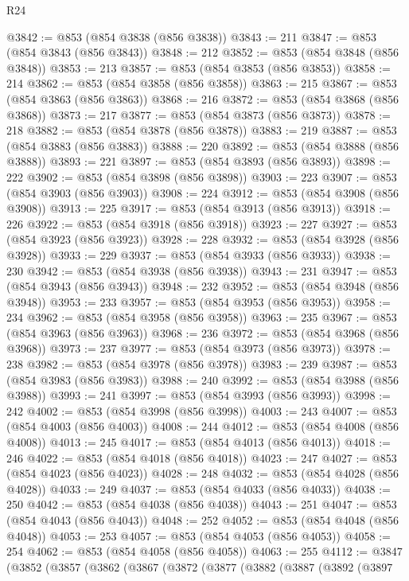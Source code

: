 \begin{lexlean}{R24}
\begin{coremodule}
@3842 := @853 (@854 @3838 (@856 @3838))
@3843 := 211
@3847 := @853 (@854 @3843 (@856 @3843))
@3848 := 212
@3852 := @853 (@854 @3848 (@856 @3848))
@3853 := 213
@3857 := @853 (@854 @3853 (@856 @3853))
@3858 := 214
@3862 := @853 (@854 @3858 (@856 @3858))
@3863 := 215
@3867 := @853 (@854 @3863 (@856 @3863))
@3868 := 216
@3872 := @853 (@854 @3868 (@856 @3868))
@3873 := 217
@3877 := @853 (@854 @3873 (@856 @3873))
@3878 := 218
@3882 := @853 (@854 @3878 (@856 @3878))
@3883 := 219
@3887 := @853 (@854 @3883 (@856 @3883))
@3888 := 220
@3892 := @853 (@854 @3888 (@856 @3888))
@3893 := 221
@3897 := @853 (@854 @3893 (@856 @3893))
@3898 := 222
@3902 := @853 (@854 @3898 (@856 @3898))
@3903 := 223
@3907 := @853 (@854 @3903 (@856 @3903))
@3908 := 224
@3912 := @853 (@854 @3908 (@856 @3908))
@3913 := 225
@3917 := @853 (@854 @3913 (@856 @3913))
@3918 := 226
@3922 := @853 (@854 @3918 (@856 @3918))
@3923 := 227
@3927 := @853 (@854 @3923 (@856 @3923))
@3928 := 228
@3932 := @853 (@854 @3928 (@856 @3928))
@3933 := 229
@3937 := @853 (@854 @3933 (@856 @3933))
@3938 := 230
@3942 := @853 (@854 @3938 (@856 @3938))
@3943 := 231
@3947 := @853 (@854 @3943 (@856 @3943))
@3948 := 232
@3952 := @853 (@854 @3948 (@856 @3948))
@3953 := 233
@3957 := @853 (@854 @3953 (@856 @3953))
@3958 := 234
@3962 := @853 (@854 @3958 (@856 @3958))
@3963 := 235
@3967 := @853 (@854 @3963 (@856 @3963))
@3968 := 236
@3972 := @853 (@854 @3968 (@856 @3968))
@3973 := 237
@3977 := @853 (@854 @3973 (@856 @3973))
@3978 := 238
@3982 := @853 (@854 @3978 (@856 @3978))
@3983 := 239
@3987 := @853 (@854 @3983 (@856 @3983))
@3988 := 240
@3992 := @853 (@854 @3988 (@856 @3988))
@3993 := 241
@3997 := @853 (@854 @3993 (@856 @3993))
@3998 := 242
@4002 := @853 (@854 @3998 (@856 @3998))
@4003 := 243
@4007 := @853 (@854 @4003 (@856 @4003))
@4008 := 244
@4012 := @853 (@854 @4008 (@856 @4008))
@4013 := 245
@4017 := @853 (@854 @4013 (@856 @4013))
@4018 := 246
@4022 := @853 (@854 @4018 (@856 @4018))
@4023 := 247
@4027 := @853 (@854 @4023 (@856 @4023))
@4028 := 248
@4032 := @853 (@854 @4028 (@856 @4028))
@4033 := 249
@4037 := @853 (@854 @4033 (@856 @4033))
@4038 := 250
@4042 := @853 (@854 @4038 (@856 @4038))
@4043 := 251
@4047 := @853 (@854 @4043 (@856 @4043))
@4048 := 252
@4052 := @853 (@854 @4048 (@856 @4048))
@4053 := 253
@4057 := @853 (@854 @4053 (@856 @4053))
@4058 := 254
@4062 := @853 (@854 @4058 (@856 @4058))
@4063 := 255
@4112 := @3847
    (@3852
      (@3857
        (@3862
          (@3867
            (@3872
              (@3877
                (@3882
                  (@3887
                    (@3892
                      (@3897

\end{coremodule}
\end{lexlean}
